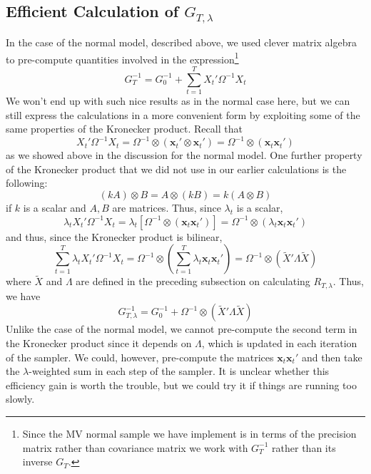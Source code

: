 \documentclass[12pt]{article}
\begin{document}
\subsection{Efficient Calculation of $G_{T,\lambda}$}
In the case of the normal model, described above, we used clever matrix algebra to pre-compute quantities involved in the expression\footnote{Since the MV normal sample we have implement is in terms of the precision matrix rather than covariance matrix we work with $G_T^{-1}$ rather than its inverse $G_T$.}
\begin{equation*}
  G_T^{-1} = G_0^{-1} + \sum_{t=1}^{T} X_t' \Omega^{-1}X_t 
\end{equation*}
We won't end up with such nice results as in the normal case here, but we can still express the calculations in a more convenient form by exploiting some of the same properties of the Kronecker product.
Recall that
\begin{equation*}
  X_t'\Omega^{-1}X_t = \Omega^{-1} \otimes (\mathbf{x}_t' \otimes \mathbf{x}_t') = \Omega^{-1} \otimes (\mathbf{x}_t \mathbf{x}_t')
\end{equation*}
as we showed above in the discussion for the normal model.
One further property of the Kronecker product that we did not use in our earlier calculations is the following:
\begin{equation*}
  (k A) \otimes B = A \otimes (kB) = k (A \otimes B)
\end{equation*}
if $k$ is a scalar and $A,B$ are matrices.
Thus, since $\lambda_t$ is a scalar, 
\begin{equation*}
  \lambda_t X_t'\Omega^{-1}X_t =\lambda_t\left[ \Omega^{-1} \otimes (\mathbf{x}_t \mathbf{x}_t')\right] = \Omega^{-1} \otimes \left( \lambda_t \mathbf{x}_t \mathbf{x}_t'\right)
\end{equation*}
and thus, since the Kronecker product is bilinear, 
\begin{equation*}
  \sum_{t=1}^{T}\lambda_t X_t' \Omega^{-1} X_t = \Omega^{-1}\otimes \left(\sum_{t=1}^T  \lambda_t \mathbf{x}_t \mathbf{x}_t'\right) = \Omega^{-1} \otimes \left( \widetilde{X}' \Lambda \widetilde{X} \right)
\end{equation*}
where $\widetilde{X}$ and $\Lambda$ are defined in the preceding subsection on calculating $R_{T,\lambda}$.
Thus, we have
\begin{equation*}
  G_{T,\lambda}^{-1} = G_0^{-1} + \Omega^{-1} \otimes \left( \widetilde{X}' \Lambda \widetilde{X} \right)
\end{equation*}
Unlike the case of the normal model, we cannot pre-compute the second term in the Kronecker product since it depends on $\Lambda$, which is updated in each iteration of the sampler.
We could, however, pre-compute the matrices $\mathbf{x}_t \mathbf{x}_t'$ and then take the $\lambda$-weighted sum in each step of the sampler.
It is unclear whether this efficiency gain is worth the trouble, but we could try it if things are running too slowly.
\end{document}
